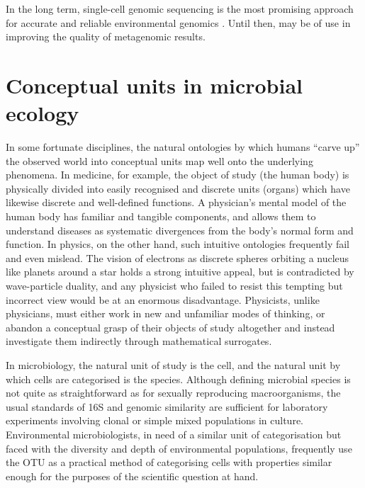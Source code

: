 In the long term, single-cell genomic sequencing is the most promising approach for accurate and reliable environmental genomics \cite{Blainey:2013dp}.
Until then,  may be of use in improving the quality of metagenomic results.

\section{Conceptual units in microbial ecology}

In some fortunate disciplines, the natural ontologies by which humans ``carve up'' the observed world into conceptual units map well onto the underlying phenomena.
In medicine, for example, the object of study (the human body) is physically divided into easily recognised and discrete units (organs) which have likewise discrete and well-defined functions.
A physician's mental model of the human body has familiar and tangible components, and allows them to understand diseases as systematic divergences from the body's normal form and function.
In physics, on the other hand, such intuitive ontologies frequently fail and even mislead.
The vision of electrons as discrete spheres orbiting a nucleus like planets around a star holds a strong intuitive appeal, but is contradicted by wave-particle duality, and any physicist who failed to resist this tempting but incorrect view would be at an enormous disadvantage.
Physicists, unlike physicians, must either work in new and unfamiliar modes of thinking, or abandon a conceptual grasp of their objects of study altogether and instead investigate them indirectly through mathematical surrogates.

In microbiology, the natural unit of study is the cell, and the natural unit by which cells are categorised is the species.
Although defining microbial species is not quite as straightforward as for sexually reproducing macroorganisms, the usual standards of 16S and genomic similarity are sufficient for laboratory experiments involving clonal or simple mixed populations in culture.
Environmental microbiologists, in need of a similar unit of categorisation but faced with the diversity and depth of environmental populations, frequently use the \ac{OTU} as a practical method of categorising cells with properties similar enough for the purposes of the scientific question at hand.


